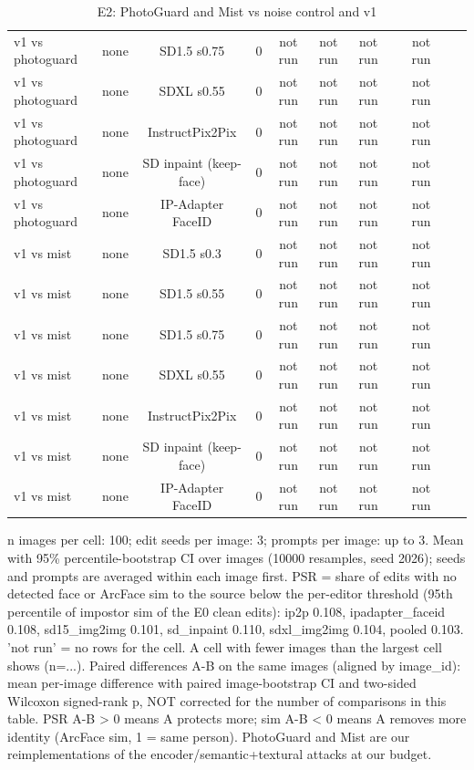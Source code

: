 \begin{table}[t]
{\begin{tabular}{lcccccccccc}
v1 vs photoguard & none & SD1.5 s0.75 & 0 & not run & not run & not run &  & not run &  &  \\
v1 vs photoguard & none & SDXL s0.55 & 0 & not run & not run & not run &  & not run &  &  \\
v1 vs photoguard & none & InstructPix2Pix & 0 & not run & not run & not run &  & not run &  &  \\
v1 vs photoguard & none & SD inpaint (keep-face) & 0 & not run & not run & not run &  & not run &  &  \\
v1 vs photoguard & none & IP-Adapter FaceID & 0 & not run & not run & not run &  & not run &  &  \\
v1 vs mist & none & SD1.5 s0.3 & 0 & not run & not run & not run &  & not run &  &  \\
v1 vs mist & none & SD1.5 s0.55 & 0 & not run & not run & not run &  & not run &  &  \\
v1 vs mist & none & SD1.5 s0.75 & 0 & not run & not run & not run &  & not run &  &  \\
v1 vs mist & none & SDXL s0.55 & 0 & not run & not run & not run &  & not run &  &  \\
v1 vs mist & none & InstructPix2Pix & 0 & not run & not run & not run &  & not run &  &  \\
v1 vs mist & none & SD inpaint (keep-face) & 0 & not run & not run & not run &  & not run &  &  \\
v1 vs mist & none & IP-Adapter FaceID & 0 & not run & not run & not run &  & not run &  &  \\
\bottomrule
\end{tabular}
}
\caption{E2: PhotoGuard and Mist vs noise control and v1}
\label{tab:e2}
\par\footnotesize n images per cell: 100; edit seeds per image: 3; prompts per image: up to 3. Mean with 95\% percentile-bootstrap CI over images (10000 resamples, seed 2026); seeds and prompts are averaged within each image first. PSR = share of edits with no detected face or ArcFace sim to the source below the per-editor threshold (95th percentile of impostor sim of the E0 clean edits): ip2p 0.108, ipadapter\_faceid 0.108, sd15\_img2img 0.101, sd\_inpaint 0.110, sdxl\_img2img 0.104, pooled 0.103. 'not run' = no rows for the cell. A cell with fewer images than the largest cell shows (n=...). Paired differences A-B on the same images (aligned by image\_id): mean per-image difference with paired image-bootstrap CI and two-sided Wilcoxon signed-rank p, NOT corrected for the number of comparisons in this table. PSR A-B > 0 means A protects more; sim A-B < 0 means A removes more identity (ArcFace sim, 1 = same person). PhotoGuard and Mist are our reimplementations of the encoder/semantic+textural attacks at our budget.
\end{table}

